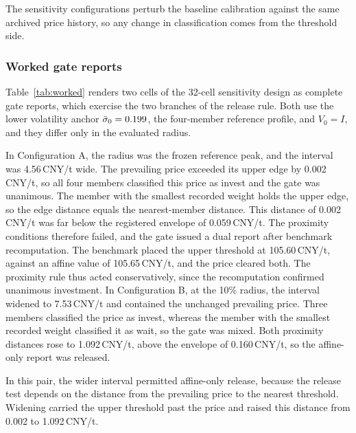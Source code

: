 The sensitivity configurations perturb the baseline calibration against the same archived price history, so any change in classification comes from the threshold side.

\subsubsection{Worked gate reports}

Table~\ref{tab:worked} renders two cells of the 32-cell sensitivity design as complete gate reports, which exercise the two branches of the release rule. Both use the lower volatility anchor $\bar{\sigma}_0=0.199$, the four-member reference profile, and $V_0=I$, and they differ only in the evaluated radius.

In Configuration A, the radius was the frozen reference peak, and the interval was 4.56\,CNY/t wide. The prevailing price exceeded its upper edge by 0.002\,CNY/t, so all four members classified this price as invest and the gate was unanimous. The member with the smallest recorded weight holds the upper edge, so the edge distance equals the nearest-member distance. This distance of 0.002\,CNY/t was far below the registered envelope of 0.059\,CNY/t. The proximity conditions therefore failed, and the gate issued a dual report after benchmark recomputation. The benchmark placed the upper threshold at 105.60\,CNY/t, against an affine value of 105.65\,CNY/t, and the price cleared both. The proximity rule thus acted conservatively, since the recomputation confirmed unanimous investment. In Configuration B, at the 10\% radius, the interval widened to 7.53\,CNY/t and contained the unchanged prevailing price. Three members classified the price as invest, whereas the member with the smallest recorded weight classified it as wait, so the gate was mixed. Both proximity distances rose to 1.092\,CNY/t, above the envelope of 0.160\,CNY/t, so the affine-only report was released.

In this pair, the wider interval permitted affine-only release, because the release test depends on the distance from the prevailing price to the nearest threshold. Widening carried the upper threshold past the price and raised this distance from 0.002 to 1.092\,CNY/t.

